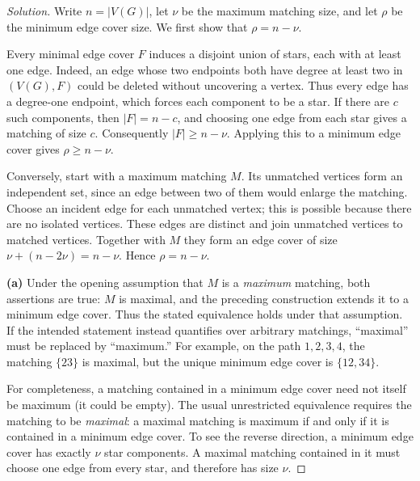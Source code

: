 \documentclass[12pt]{amsart}
\newenvironment{solution}{\begin{proof}[Solution]}{\end{proof}}
\begin{document}
    \begin{solution}

        Write $n=|V(G)|$, let $\nu$ be the maximum matching size, and let
        $\rho$ be the minimum edge cover size. We first show that
        $\rho=n-\nu$.

        Every minimal edge cover $F$ induces a disjoint union of stars, each
        with at least one edge. Indeed, an edge whose two endpoints both have
        degree at least two in $(V(G),F)$ could be deleted without uncovering
        a vertex. Thus every edge has a degree-one endpoint, which forces
        each component to be a star. If there are $c$ such components, then
        $|F|=n-c$, and choosing one edge from each star gives a matching of
        size $c$. Consequently $|F|\ge n-\nu$. Applying this to a minimum
        edge cover gives $\rho\ge n-\nu$.

        Conversely, start with a maximum matching $M$. Its unmatched vertices
        form an independent set, since an edge between two of them would
        enlarge the matching. Choose an incident edge for each unmatched
        vertex; this is possible because there are no isolated vertices.
        These edges are distinct and join unmatched vertices to matched
        vertices. Together with $M$ they form an edge cover of size
        $\nu+(n-2\nu)=n-\nu$. Hence $\rho=n-\nu$.

        \smallskip
        \noindent\textbf{(a)} Under the opening assumption that $M$ is a
        \emph{maximum} matching, both assertions are true: $M$ is maximal,
        and the preceding construction extends it to a minimum edge cover.
        Thus the stated equivalence holds under that assumption.
        If the intended statement instead quantifies over arbitrary matchings,
        ``maximal'' must be replaced by ``maximum.'' For example, on the path
        $1,2,3,4$, the matching $\{23\}$ is maximal, but the unique minimum
        edge cover is $\{12,34\}$.

        For completeness, a matching contained in a minimum edge cover need
        not itself be maximum (it could be empty). The usual unrestricted
        equivalence requires the matching to be \emph{maximal}: a maximal
        matching is maximum if and only if it is contained in a minimum edge
        cover. To see the reverse direction, a minimum edge cover has exactly
        $\nu$ star components. A maximal matching contained in it must choose
        one edge from every star, and therefore has size $\nu$.


\end{solution}
\end{document}
